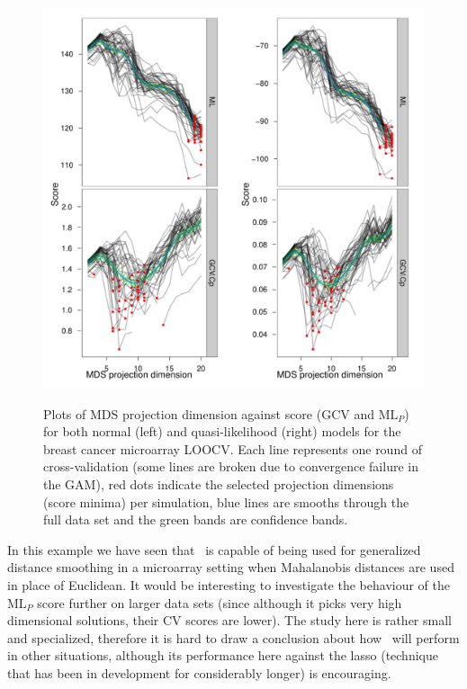 \begin{figure}
\centering
\includegraphics[width=6in]{gds/figs/breastcancer-dimselect.pdf} \\
\caption{Plots of MDS projection dimension against score (GCV and $\text{ML}_P$) for both normal (left) and quasi-likelihood (right) models for the breast cancer microarray LOOCV. Each line represents one round of cross-validation (some lines are broken due to convergence failure in the GAM), red dots indicate the selected projection dimensions (score minima) per simulation, blue lines are smooths through the full data set and the green bands are confidence bands.}
\label{breastcancer-dimselect}
\end{figure}

In this example we have seen that \mdsds\ is capable of being used for generalized distance smoothing in a microarray setting when Mahalanobis distances are used in place of Euclidean. It would be interesting to investigate the behaviour of the $\text{ML}_P$ score further on larger data sets (since although it picks very high dimensional solutions, their CV scores are lower). The study here is rather small and specialized, therefore it is hard to draw a conclusion about how \mdsds\ will perform in other situations, although its performance here against the lasso (technique that has been in development for considerably longer) is encouraging.

